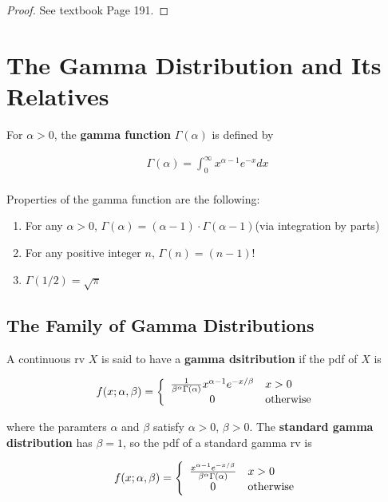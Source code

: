 \begin{proof}
    See textbook Page 191.
\end{proof}

\section{The Gamma Distribution and Its Relatives}

\begin{definition}
    For $\alpha > 0$, the \textbf{gamma function} $\Gamma(\alpha)$ is defined by

    \begin{align*}
        \Gamma(\alpha) = \int_0^\infty x^{\alpha-1}e^{-x}dx \\
    \end{align*}

    Properties of the gamma function are the following:

    \begin{enumerate}
        \item For any $\alpha>0$, $\Gamma(\alpha) = (\alpha - 1)\cdot \Gamma(\alpha - 1)$(via integration by parts)
        \item For any positive integer $n$, $\Gamma(n) = (n-1)!$
        \item $\Gamma(1/2) = \sqrt{\pi}$
    \end{enumerate}
\end{definition}

\subsection{The Family of Gamma Distributions}

\begin{definition}
    A continuous rv $X$ is said to have a \textbf{gamma dsitribution} if the pdf of $X$ is 

    \begin{align*}
        f(x;\alpha,\beta) = \left\{\begin{array}{cl}
            \frac{1}{\beta^\alpha\Gamma(\alpha)}x^{\alpha-1}e^{-x/\beta} & x>0 \\
            0 & {\rm otherwise} \\
        \end{array}\right.
    \end{align*}

    where the paramters $\alpha$ and $\beta$ satisfy $\alpha>0$, $\beta>0$. The \textbf{standard gamma distribution} has $\beta=1$, so the pdf of a standard gamma rv is 

    \begin{align*}
        f(x;\alpha,\beta) = \left\{\begin{array}{cl}
            \frac{x^{\alpha-1}e^{-x/\beta}}{\beta^\alpha\Gamma(\alpha)} & x>0 \\
            0 & {\rm otherwise} \\
        \end{array}\right.
    \end{align*}
\end{definition}

